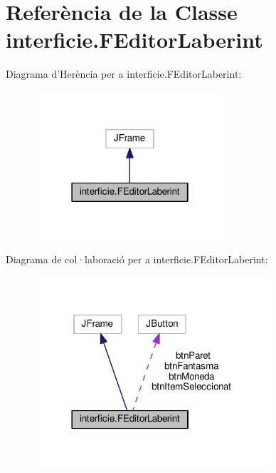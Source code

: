 \hypertarget{classinterficie_1_1_f_editor_laberint}{\section{Referència de la Classe interficie.\+F\+Editor\+Laberint}
\label{classinterficie_1_1_f_editor_laberint}
}


Diagrama d'Herència per a interficie.\+F\+Editor\+Laberint\+:\nopagebreak
\begin{figure}[H]
\begin{center}
\leavevmode
\includegraphics[width=202pt]{classinterficie_1_1_f_editor_laberint__inherit__graph}
\end{center}
\end{figure}


Diagrama de col·laboració per a interficie.\+F\+Editor\+Laberint\+:\nopagebreak
\begin{figure}[H]
\begin{center}
\leavevmode
\includegraphics[width=249pt]{classinterficie_1_1_f_editor_laberint__coll__graph}
\end{center}
\end{figure}
